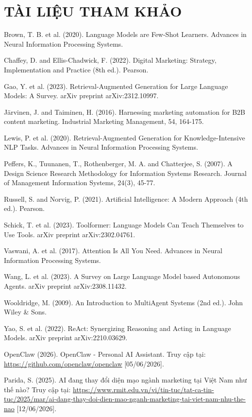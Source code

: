 \documentclass[a4paper]{article}
\newcommand{\chap}[1]{\clearpage\section*{#1}\phantomsection\addcontentsline{toc}{section}{#1}}
\begin{document}
\chap{TÀI LIỆU THAM KHẢO}
\begin{enumerate}[leftmargin=1.1cm,label={[\arabic*]}]
\item Brown, T. B. et al. (2020). Language Models are Few-Shot Learners. Advances in Neural Information Processing Systems.
\item Chaffey, D. and Ellis-Chadwick, F. (2022). Digital Marketing: Strategy, Implementation and Practice (8th ed.). Pearson.
\item Gao, Y. et al. (2023). Retrieval-Augmented Generation for Large Language Models: A Survey. arXiv preprint arXiv:2312.10997.
\item Järvinen, J. and Taiminen, H. (2016). Harnessing marketing automation for B2B content marketing. Industrial Marketing Management, 54, 164-175.
\item Lewis, P. et al. (2020). Retrieval-Augmented Generation for Knowledge-Intensive NLP Tasks. Advances in Neural Information Processing Systems.
\item Peffers, K., Tuunanen, T., Rothenberger, M. A. and Chatterjee, S. (2007). A Design Science Research Methodology for Information Systems Research. Journal of Management Information Systems, 24(3), 45-77.
\item Russell, S. and Norvig, P. (2021). Artificial Intelligence: A Modern Approach (4th ed.). Pearson.
\item Schick, T. et al. (2023). Toolformer: Language Models Can Teach Themselves to Use Tools. arXiv preprint arXiv:2302.04761.
\item Vaswani, A. et al. (2017). Attention Is All You Need. Advances in Neural Information Processing Systems.
\item Wang, L. et al. (2023). A Survey on Large Language Model based Autonomous Agents. arXiv preprint arXiv:2308.11432.
\item Wooldridge, M. (2009). An Introduction to MultiAgent Systems (2nd ed.). John Wiley \& Sons.
\item Yao, S. et al. (2022). ReAct: Synergizing Reasoning and Acting in Language Models. arXiv preprint arXiv:2210.03629.
\item OpenClaw (2026). OpenClaw - Personal AI Assistant. Truy cập tại: \url{https://github.com/openclaw/openclaw} [05/06/2026].
\item Parida, S. (2025). AI đang thay đổi diện mạo ngành marketing tại Việt Nam như thế nào? Truy cập tại: \url{https://www.rmit.edu.vn/vi/tin-tuc/tat-ca-tin-tuc/2025/mar/ai-dang-thay-doi-dien-mao-nganh-marketing-tai-viet-nam-nhu-the-nao} [12/06/2026].
\end{enumerate}
\end{document}
